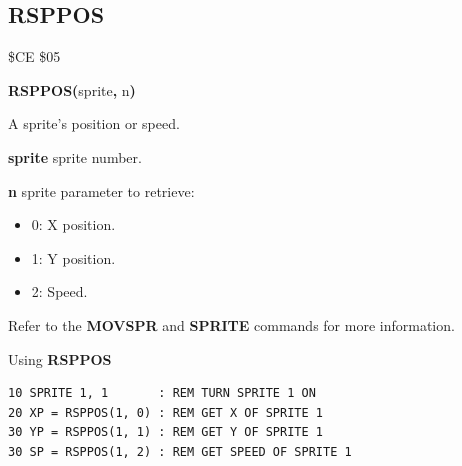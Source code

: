 \subsection{RSPPOS}
\begin{description}[leftmargin=2cm,style=nextline]
\item [Token:]    \$CE \$05

\item [Format:]   {\bf RSPPOS(}sprite{\bf,} n{\bf)}

\item [Returns:]  A sprite's position or speed.

                  {\bf sprite} sprite number.

                  {\bf n} sprite parameter to retrieve:

                  \begin{itemize}
                     \item 0: X position.
                     \item 1: Y position.
                     \item 2: Speed.
                  \end{itemize}

\item [Remarks:]  Refer to the {\bf MOVSPR} and {\bf SPRITE} commands for more information.

\item [Example:]  Using {\bf RSPPOS}
\begin{tcolorbox}[colback=black,coltext=white]
\verbatimfont{\codefont}
\begin{verbatim}
10 SPRITE 1, 1       : REM TURN SPRITE 1 ON
20 XP = RSPPOS(1, 0) : REM GET X OF SPRITE 1
30 YP = RSPPOS(1, 1) : REM GET Y OF SPRITE 1
30 SP = RSPPOS(1, 2) : REM GET SPEED OF SPRITE 1
\end{verbatim}
\end{tcolorbox}
\end{description}


\newpage
